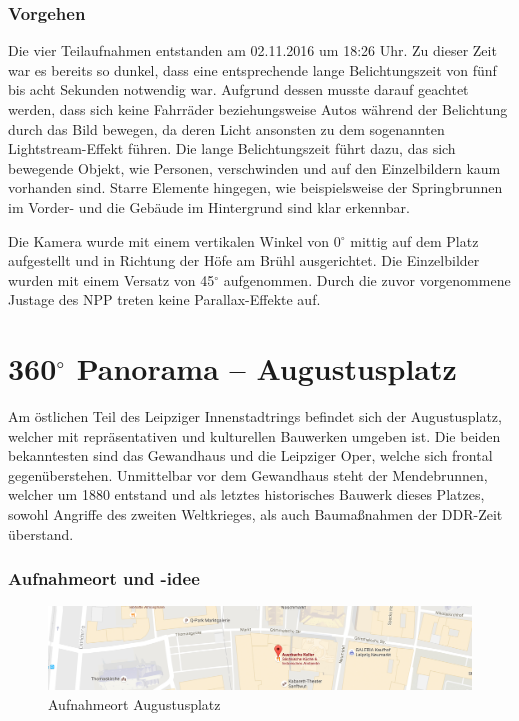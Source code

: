 \documentclass[liststotoc,bibtotoc,fontsize=14pt,]{scrreprt}
\begin{document}
			
	\subsubsection{Vorgehen}
	Die vier Teilaufnahmen entstanden am 02.11.2016 um 18:26 Uhr. Zu dieser Zeit war es bereits so dunkel, dass eine entsprechende lange Belichtungszeit von fünf bis acht Sekunden notwendig war. Aufgrund dessen musste darauf geachtet werden, dass sich keine Fahrräder beziehungsweise Autos während der Belichtung durch das Bild bewegen, da deren Licht ansonsten zu dem sogenannten \grqq{}Lightstream-Effekt\grqq{} führen. Die lange Belichtungszeit führt dazu, das sich bewegende Objekt, wie Personen, verschwinden und auf den Einzelbildern kaum vorhanden sind. Starre Elemente hingegen, wie beispielsweise der Springbrunnen im Vorder- und die Gebäude im Hintergrund sind klar erkennbar. 
	
	\bigskip
	Die Kamera wurde mit einem vertikalen Winkel von 0$^\circ$  mittig auf dem Platz aufgestellt und in Richtung der Höfe am Brühl ausgerichtet. Die Einzelbilder wurden mit einem Versatz von 45$^\circ$ aufgenommen. Durch die zuvor vorgenommene Justage des NPP treten keine Parallax-Effekte auf. 
	
	\section{360$^\circ$ Panorama -- Augustusplatz}
	Am östlichen Teil des Leipziger Innenstadtrings befindet sich der Augustusplatz, welcher mit repräsentativen und kulturellen Bauwerken umgeben ist. Die beiden bekanntesten sind das Gewandhaus und die Leipziger Oper, welche sich frontal gegenüberstehen. Unmittelbar vor dem Gewandhaus steht der Mendebrunnen, welcher um 1880 entstand und als letztes historisches Bauwerk dieses Platzes, sowohl Angriffe des zweiten Weltkrieges, als auch Baumaßnahmen der DDR-Zeit überstand. 
	\label{sec:augustus}
	\subsubsection{Aufnahmeort und -idee}
	
			\begin{figure}[H]
				\includegraphics[width=\linewidth]{img/places/ak_map.jpg}
				\caption{Aufnahmeort Augustusplatz}
				\label{img:ak_map}
			\end{figure}
	
\end{document}

